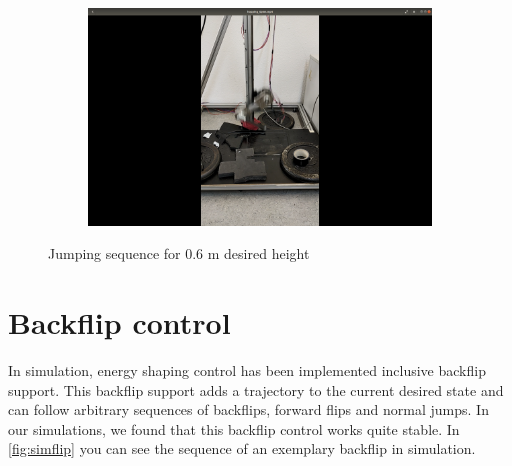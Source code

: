 \documentclass[onecolumn, letter paper]{report}
\begin{document}
\begin{figure}[htb!]
\begin{subfigure}{.24\textwidth}
    \end{subfigure}
    \begin{subfigure}{.24\textwidth}
    \includegraphics[width=\textwidth, trim={25cm 15cm 25cm 5cm}, clip]{figures/0.6m/p6m4.png}
    \end{subfigure}
    \caption{Jumping sequence for 0.6 m desired height}
    \label{fig:sequence6}
\end{figure}


\clearpage
\section{Backflip control}
In simulation, energy shaping control has been implemented inclusive backflip support. This backflip support adds
a trajectory to the current desired state and can follow arbitrary sequences of backflips, forward flips and normal jumps. In our simulations, we found that this backflip control works quite stable.
In \autoref{fig:simflip} you can see the sequence of an exemplary backflip in simulation.
\end{document}

